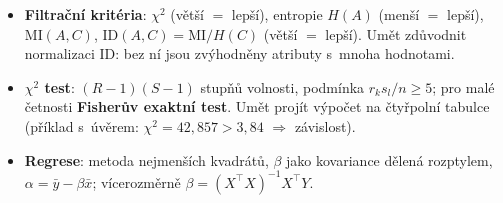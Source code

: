 \documentclass[11pt,a4paper]{article}
\theoremstyle{definition}
\begin{document}
\begin{itemize}
 \emph{bottom-up} (přidávání) nebo \emph{top-down} (odebírání).
\item \textbf{Filtrační kritéria}: $\chi^2$ (větší $=$ lepší), entropie $H(A)$ (menší $=$
 lepší), $\mathrm{MI}(A,C)$, $\mathrm{ID}(A,C)=\mathrm{MI}/H(C)$ (větší $=$ lepší).
 Umět zdůvodnit normalizaci $\mathrm{ID}$: bez ní jsou zvýhodněny atributy s~mnoha
 hodnotami.
\item \textbf{$\chi^2$ test}: $(R-1)(S-1)$ stupňů volnosti, podmínka $r_ks_l/n\ge 5$; pro
 malé četnosti \textbf{Fisherův exaktní test}. Umět projít výpočet na čtyřpolní tabulce
 (příklad s~úvěrem: $\chi^2=42{,}857>3{,}84$ $\Rightarrow$ závislost).
\item \textbf{Regrese}: metoda nejmenších kvadrátů, $\beta$ jako kovariance dělená
 rozptylem, $\alpha=\bar y-\beta\bar x$; vícerozměrně
 $\beta=(X^{\!\top}\!X)^{-1}X^{\!\top}Y$.
\end{itemize}
\end{document}
